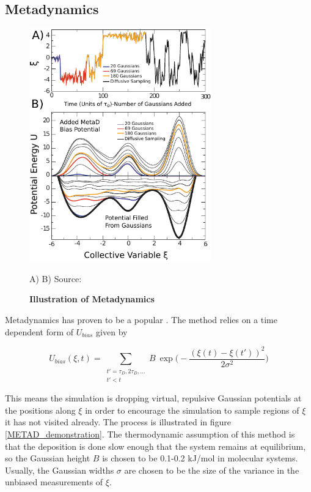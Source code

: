 \subsection{Metadynamics}
\begin{figure}
	\begin{center}
		\includegraphics[width=0.7\textwidth]{figures/METAD_demonstration.pdf}
	\end{center}
	\captionsetup{singlelinecheck = false, justification=raggedright}
	\caption[Illustration of Metadynamics] {\textbf{Illustration of Metadynamics}}{A) B) Source\cite{bussi2020}:}
	\label{umbrella_sampling_illustration}
\end{figure}

Metadynamics has proven to be a popular . The method relies on a time dependent form of $U_{bias}$ given by 

\begin{equation}
	U_{bias} (\xi,t) = \sum\limits_{\substack{t' = \tau_D, 2 \tau_D,... \\ t' < t}}  B \ \exp\bigg( - \frac{(\xi(t) - \xi(t') )^2}{2\sigma^2 }\bigg)
\end{equation}

This means the simulation is dropping virtual, repulsive Gaussian potentials at the positions along $\xi$ in order to encourage the simulation to sample regions of $\xi$ it has not visited already. The process is illustrated in figure \ref{METAD_demonstration}. The thermodynamic assumption of this method is that the deposition is done slow enough that the system remains at equilibrium, so the Gaussian height $B$ is chosen to be 0.1-0.2 kJ/mol in molecular systems. Usually, the Gaussian widths $\sigma$ are chosen to be the size of the variance in the unbiased measurements of $\xi$. 

